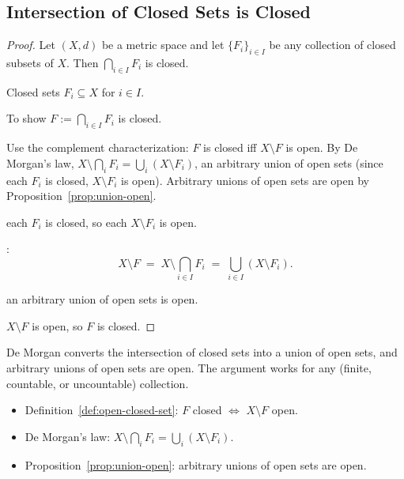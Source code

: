 
\subsection*{Intersection of Closed Sets is Closed}
\label{prf:intersection-closed}

\begin{proof}
\Claim Let $(X,d)$ be a metric space and let $\{F_i\}_{i \in I}$ be any
collection of closed subsets of $X$. Then $\bigcap_{i \in I} F_i$ is closed.

\Given Closed sets $F_i \subseteq X$ for $i \in I$.

\Goal To show $F := \bigcap_{i \in I} F_i$ is closed.

\Strategy Use the complement characterization: $F$ is closed iff $X \setminus F$ is open.
By De Morgan's law, $X \setminus \bigcap_i F_i = \bigcup_i (X \setminus F_i)$,
an arbitrary union of open sets (since each $F_i$ is closed, $X \setminus F_i$ is open).
Arbitrary unions of open sets are open by Proposition~\ref{prop:union-open}.

\medskip
\ByAss each $F_i$ is closed, so each $X \setminus F_i$ is open.

:
\[
X \setminus F \;=\; X \setminus \bigcap_{i \in I} F_i \;=\; \bigcup_{i \in I} (X \setminus F_i).
\]

 an arbitrary union of open sets is open.

\Therefore $X \setminus F$ is open, so $F$ is closed. \AsReq
\end{proof}

\begin{remark*}
De Morgan converts the intersection of closed sets into a union of open sets,
and arbitrary unions of open sets are open. The argument works for any
(finite, countable, or uncountable) collection.
\end{remark*}

\begin{remark*}[Dependencies]
\begin{itemize}
  \item Definition~\ref{def:open-closed-set}: $F$ closed $\iff$ $X \setminus F$ open.
  \item De Morgan's law: $X \setminus \bigcap_i F_i = \bigcup_i (X \setminus F_i)$.
  \item Proposition~\ref{prop:union-open}: arbitrary unions of open sets are open.
\end{itemize}
\end{remark*}
